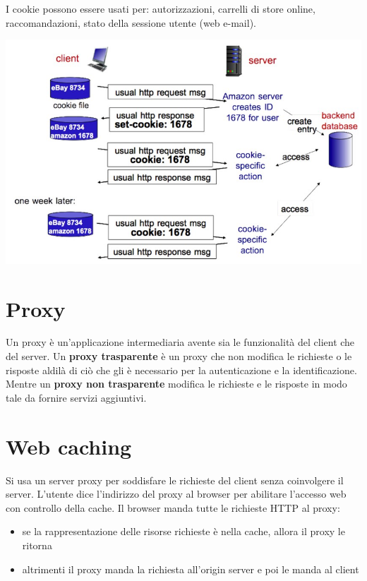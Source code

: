 I cookie possono essere usati per: autorizzazioni, carrelli di store online, raccomandazioni, stato della sessione utente (web e-mail).

\begin{center}
\includegraphics[scale=0.4]{Images/TecnologieWeb/1/Cookies.jpg}    
\end{center}

\section{Proxy}
Un proxy è un'applicazione intermediaria avente sia le funzionalità del client che del server. Un \textbf{proxy trasparente} è un proxy che non modifica le richieste o le risposte aldilà di ciò che gli è necessario per la autenticazione e la identificazione. Mentre un \textbf{proxy non trasparente} modifica le richieste e le risposte in modo tale da fornire servizi aggiuntivi.

\section{Web caching}
Si usa un server proxy per soddisfare le richieste del client senza coinvolgere il server. L'utente dice l'indirizzo del proxy al browser per abilitare l'accesso web con controllo della cache. Il browser manda tutte le richieste HTTP al proxy:
\begin{itemize}
    \item se la rappresentazione delle risorse richieste è nella cache, allora il proxy le ritorna
    \item altrimenti il proxy manda la richiesta all'origin server e poi le manda al client
\end{itemize}

